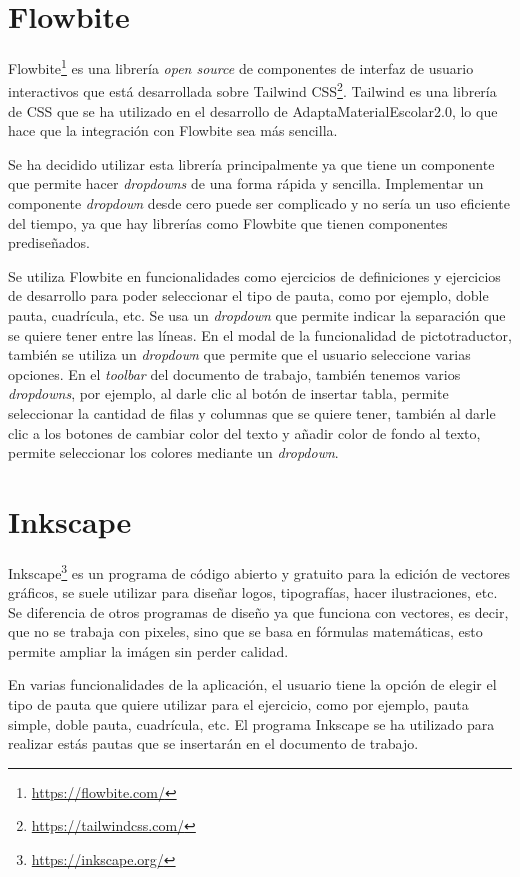 \section{Flowbite}\label{sec:Flowbite}
Flowbite\footnote{\url{https://flowbite.com/}} es una librería \textit{open source} de componentes de interfaz de usuario interactivos que está desarrollada sobre Tailwind CSS\footnote{\url{https://tailwindcss.com/}}. Tailwind es una librería de CSS que se ha utilizado en el desarrollo de AdaptaMaterialEscolar2.0, lo que hace que la integración con Flowbite sea más sencilla.

Se ha decidido utilizar esta librería principalmente ya que tiene un componente que permite hacer \textit{dropdowns} de una forma rápida y sencilla. Implementar un componente \textit{dropdown} desde cero puede ser complicado y no sería un uso eficiente del tiempo, ya que hay librerías como Flowbite que tienen componentes prediseñados.

Se utiliza Flowbite en funcionalidades como ejercicios de definiciones y ejercicios de desarrollo para poder seleccionar el tipo de pauta, como por ejemplo, doble pauta, cuadrícula, etc. Se usa un \textit{dropdown} que permite indicar la separación que se quiere tener entre las líneas. En el modal de la funcionalidad de pictotraductor, también se utiliza un \textit{dropdown} que permite que el usuario seleccione varias opciones. En el \textit{toolbar} del documento de trabajo, también tenemos varios \textit{dropdowns}, por ejemplo, al darle clic al botón de insertar tabla, permite seleccionar la cantidad de filas y columnas que se quiere tener, también al darle clic a los botones de cambiar color del texto y añadir color de fondo al texto, permite seleccionar los colores mediante un \textit{dropdown}.

\section{Inkscape}\label{sec:inkscape}
Inkscape\footnote{\url{https://inkscape.org/}} es un programa de código abierto y gratuito para la edición de vectores gráficos, se suele utilizar para diseñar logos, tipografías, hacer ilustraciones, etc. Se diferencia de otros programas de diseño ya que funciona con vectores, es decir, que no se trabaja con pixeles, sino que se basa en fórmulas matemáticas, esto permite ampliar la imágen sin perder calidad.

En varias funcionalidades de la aplicación, el usuario tiene la opción de elegir el tipo de pauta que quiere utilizar para el ejercicio, como por ejemplo, pauta simple, doble pauta, cuadrícula, etc. El programa Inkscape se ha utilizado para realizar estás pautas que se insertarán en el documento de trabajo.


